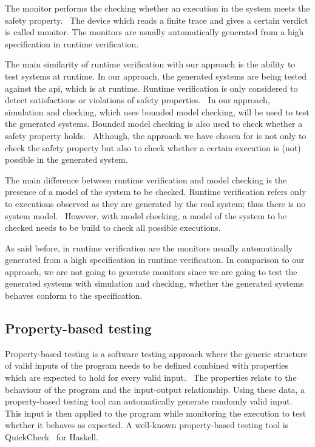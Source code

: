 The monitor performs the checking whether an execution in the system meets the
safety property.~\cite[p.~295]{leucker2009brief}
The device which reads a finite trace and gives a certain verdict is called
monitor. The monitors are usually automatically generated from a high
specification in runtime verification.~\cite{leucker2009brief, falcone2009runtime}

The main similarity of runtime verification with our approach is the ability to
test systems at runtime. In our approach, the generated systems are being tested
against the \gls{api}, which is at runtime.
Runtime verification is only considered to detect satisfactions or violations of
safety properties.~\cite{leucker2009brief, falcone2009runtime}
In our approach, simulation and checking, which uses bounded model checking,
will be used to test the generated systems. Bounded model checking is also used
to check whether a safety property holds.~\cite[p.~4]{stoel_storm_vinju_bosman_2016}
Although, the approach we have chosen for is
not only to check the safety property but also to check whether a certain
execution is (not) possible in the generated system.

The main difference between runtime verification and model checking is the
presence of a model of the system to be checked.
Runtime verification refers only to executions observed as they are generated by
the real system; thus there is no system model.~\cite[p.~295]{leucker2009brief}
However, with model checking, a model of the system to be checked needs to be
build to check all possible executions.

As said before, in runtime verification are the monitors usually automatically
generated from a high specification in runtime verification. In comparison to
our approach, we are not going to generate monitors since we are going to test
the generated systems with simulation and checking,
whether the generated systems behaves conform to the specification.

\subsection*{Property-based testing}

Property-based testing is a software testing approach where the generic
structure of valid inputs of the program needs to be defined combined with
properties which are expected to hold for every valid
input.~\cite[p.~3]{papadakis2011proper} The properties relate to the behaviour
of the program and the input-output relationship. Using these data, a
property-based testing tool can automatically generate randomly valid input.
This input is then applied to the program while monitoring the execution to
test whether it behaves as expected. A well-known property-based testing tool is
QuickCheck~\cite{claessen2011quickcheck} for Haskell.

